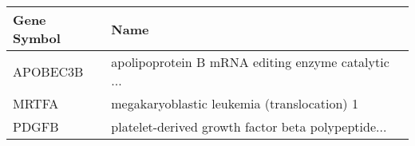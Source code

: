 \begin{tabular}{ll}
\toprule
Gene Symbol &                                               Name \\
\midrule
   APOBEC3B & apolipoprotein B mRNA editing enzyme catalytic ... \\
      MRTFA &        megakaryoblastic leukemia (translocation) 1 \\
      PDGFB & platelet-derived growth factor beta polypeptide... \\
\bottomrule
\end{tabular}
